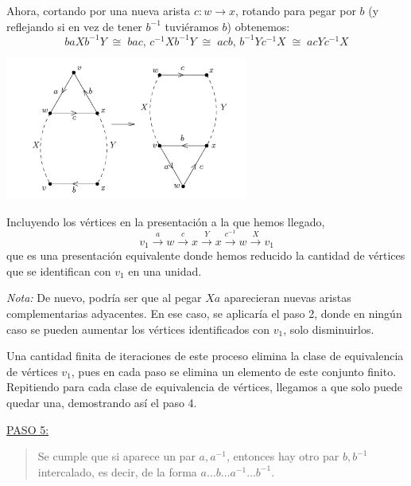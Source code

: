 {    \vspace{0.5em}
    \noindent
    Ahora, cortando por una nueva arista $c : w \to x$, rotando para pegar por $b$ 
    (y reflejando si en vez de tener $b^{-1}$ tuviéramos $b$) obtenemos:
    \[
        baXb^{-1}Y \;\cong\; bac \text{, } c^{-1}Xb^{-1}Y \;\cong\; acb \text{, } b^{-1}Yc^{-1}X \;\cong\; acYc^{-1}X
    \]

    \begin{center}
        \includegraphics[width=0.6\textwidth]{img/teorema-clasificacion/paso4.png}
    \end{center}

    \noindent
    Incluyendo los vértices en la presentación a la que hemos llegado, 
    \[
        v_1 \overset{a}{\to} w \overset{c}{\to} x \overset{Y}{\to} x \overset{c^{-1}}{\to} w \overset{X}{\to} v_1
    \]
    que es una presentación equivalente donde hemos reducido la cantidad de vértices que se identifican con $v_1$ en una unidad.

    \vspace{0.5em}
    \noindent
    \textit{Nota:} De nuevo, podría ser que al pegar $X a$ aparecieran nuevas aristas complementarias adyacentes. 
    En ese caso, se aplicaría el paso 2, donde en ningún caso se pueden aumentar los vértices identificados con $v_1$, solo disminuirlos.

    \vspace{0.5em}
    \noindent
    Una cantidad finita de iteraciones de este proceso elimina la clase de equivalencia de vértices $v_1$, 
    pues en cada paso se elimina un elemento de este conjunto finito. 
    Repitiendo para cada clase de equivalencia de vértices, llegamos a que solo puede quedar una, 
    demostrando así el paso 4.

    \vspace{1.3em}
    \noindent
    \underline{PASO 5:}
    \begin{quote}
        Se cumple que si aparece un par $a, a^{-1}$, entonces hay otro par $b, b^{-1}$ intercalado, 
        es decir, de la forma $a\dots b\dots a^{-1} \dots b^{-1}$.
    \end{quote}

}
